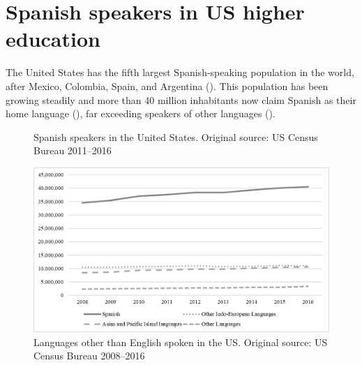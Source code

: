 \documentclass[output=paper]{../langscibook}
\begin{document}
 \section{Spanish speakers in US higher education}


The United States has the fifth largest Spanish-speaking population in the world, after Mexico, Colombia, Spain, and Argentina (\citealt{EscobarPotowski2015}). This population has been growing steadily and more than 40 million inhabitants now claim Spanish as their home language (), far exceeding speakers of other languages ().



\begin{figure}
\footnotesize
\caption{Spanish speakers in the United States. Original source: US Census Bureau 2011--2016\label{fig:3:1}}
\end{figure}

\begin{figure}
  \includegraphics[width=.9\textwidth]{figures/Chapter3-img002.png}
  \caption{Languages other than English spoken in the US. Original source: US Census Bureau 2008--2016}
  \label{fig:3:2}
\end{figure}
\end{document}
